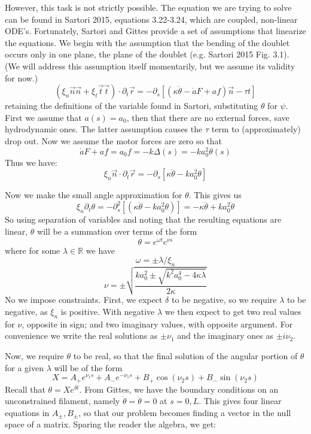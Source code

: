 \documentclass{article}
\theoremstyle{exampstyle} \newtheorem*{remark}{Remark}
\newcommand{\1}{\mathds{1}}
\begin{document}
However, this task is not strictly possible. The equation we are trying to solve can be found in Sartori 2015, equations 3.22-3.24, which are coupled, non-linear ODE's. Fortunately, Sartori and Gittes provide a set of assumptions that linearize the equations. We begin with the assumption that the bending of the doublet occurs only in one plane, the plane of the doublet (e.g. Sartori 2015 Fig. 3.1). (We will address this assumption itself momentarily, but we assume its validity for now.)
$$ (\xi_n \vec{n}\vec{n} + \xi_t \vec{t}\vec{t}) \cdot \partial_t \vec{r} =-\partial_s [(\kappa \ddot{\theta}-\dot{a}F+af)\vec{n}-\tau t] $$
retaining the definitions of the variable found in Sartori, substituting $\theta$ for $\psi$. First we assume that $a(s)=a_0$, then that there are no external forces, save hydrodynamic ones. The latter assumption causes the $\tau$ term to (approximately) drop out. Now we assume the motor forces are zero so that 
$$\dot{a}F+af=a_0f=-k\Delta(s)=-ka_0^2\theta(s) $$
Thus we have:
$$ \xi_n \vec{n} \cdot \partial_t \vec{r} = -\partial_s [\kappa\ddot{\theta} -ka_0^2\theta]$$

Now we make the small angle approximation for $\theta$. This gives us
$$\xi_n \partial_t \theta = -\partial_s^2 [(\kappa\ddot{\theta} -ka_0^2\theta)] =-\kappa\ddddot{\theta} +ka_0^2\ddot{\theta}$$
So using separation of variables and noting that the resulting equations are linear, $\theta$ will be a summation over terms of the form 
$$ \theta=e^{\omega t} e^{\nu s} $$
where for some $\lambda \in \mathbb{R}$ we have
$$ \omega=\pm \lambda/\xi_n $$
$$ \nu=\pm \sqrt{ \frac{ ka_0^2 \pm \sqrt{k^2a_0^4-4\kappa\lambda} }{2\kappa} } $$
No we impose constraints. First, we expect $\delta$ to be negative, so we require $\lambda$ to be negative, as $\xi_n$ is positive. With negative $\lambda$ we then expect to get two real values for $\nu$, opposite in sign; and two imaginary values, with opposite argument. For convenience we write the real solutions as $\pm \nu_1$ and the imaginary ones as $\pm i \nu_2 $.

Now, we require $\theta$ to be real, so that the final solution of the angular portion of $\theta$ for a given $\lambda$ will be of the form
$$X=A_+e^{\nu_1 s}+A_-e^{-\nu_1 s}+B_+ \cos(\nu_2 s) +B_-\sin(\nu_2 s) $$
Recall that $\theta = X e^{\delta t}$. From Gittes, we have the boundary conditions on an unconstrained filament, namely $\dot{\theta}=\ddot{\theta}=0$ at $s=0,L$.
This gives four linear equations in $A_{\pm},B_{\pm}$, so that our problem becomes finding a vector in the null space of a matrix. Sparing the reader the algebra, we get:
\end{document}
